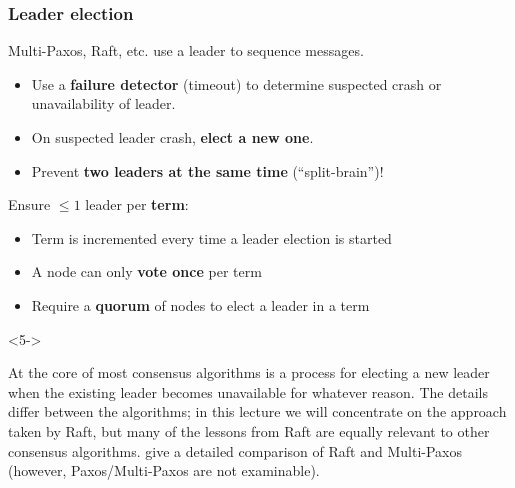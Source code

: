 \begin{frame}
    \label{s:leader-election}
    \frametitle{Leader election}
    Multi-Paxos, Raft, etc. use a leader to sequence messages.\pause
    \begin{itemize}
        \item Use a \textbf{failure detector} (timeout) to determine suspected crash or unavailability of leader.
        \item On suspected leader crash, \textbf{elect a new one}.\pause
        \item Prevent \textbf{two leaders at the same time} (``split-brain'')!\\[0.5em]\pause
    \end{itemize}
    Ensure $\le 1$ leader per \textbf{term}:
    \begin{itemize}
        \item Term is incremented every time a leader election is started\pause
        \item A node can only \textbf{vote once} per term
        \item Require a \textbf{quorum} of nodes to elect a leader in a term\\[0.5em]
    \end{itemize}
    \begin{uncoverenv}<5->
    \end{uncoverenv}
\end{frame}
\label{l:leader-election}

At the core of most consensus algorithms is a process for electing a new leader when the existing leader becomes unavailable for whatever reason.
The details differ between the algorithms; in this lecture we will concentrate on the approach taken by Raft, but many of the lessons from Raft are equally relevant to other consensus algorithms.
\citet{Howard:2020} give a detailed comparison of Raft and Multi-Paxos (however, Paxos/Multi-Paxos are not examinable).

